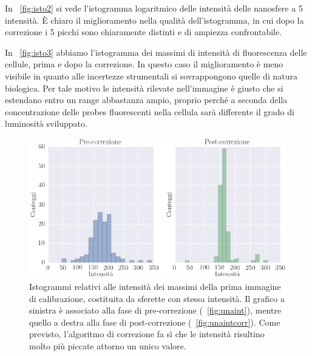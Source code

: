 In \figurename~\ref{fig:isto2} si vede l'istogramma logaritmico delle intensità delle nanosfere a 5 intensità. 
È chiaro il miglioramento nella qualità dell'istogramma, in cui dopo la correzione i 5 picchi sono chiaramente distinti e di ampiezza confrontabile.

In \figurename~\ref{fig:isto3} abbiamo l'istogramma dei massimi di intensità di fluorescenza delle cellule, prima e dopo la correzione.
In questo caso il miglioramento è meno visibile in quanto alle incertezze strumentali si sovrappongono quelle di natura biologica.
Per tale motivo le intensità rilevate nell'immagine è giusto che si estendano entro un range abbastanza ampio, proprio perché a seconda della concentrazione delle probes fluorescenti nella cellula sarà differente il grado di luminosità sviluppato.

\begin{figure}
 \centering
 \includegraphics[scale=.55]{img/CAP4isto1.png}
 \caption{\small{Istogrammi relativi alle intensità dei massimi della prima immagine di calibrazione, costituita da sferette con stessa intensità. Il grafico a sinistra è associato alla fase di pre-correzione (\figurename~\ref{fig:unaint}), mentre quello a destra alla fase di post-correzione (\figurename~\ref{fig:unaintcorr}). Come previsto, l'algoritmo di correzione fa sì che le intensità risultino molto più piccate attorno un unico valore.}}
 \label{fig:isto1}
\end{figure}

